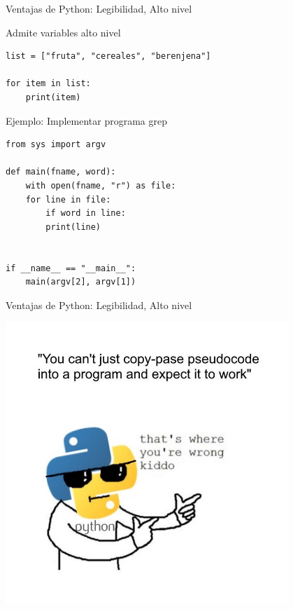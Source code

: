 \documentclass[bigger,unknownkeysallowed]{beamer}
\begin{document}
\begin{frame}[fragile,label={sec:orgfaa25ae}]{Ventajas de Python: Legibilidad, Alto nivel}
 \begin{exampleblock}{Admite variables alto nivel}
\begin{verbatim}
list = ["fruta", "cereales", "berenjena"]

for item in list:
    print(item)
\end{verbatim}
\end{exampleblock}

\begin{exampleblock}{Ejemplo: Implementar programa grep}
\begin{verbatim}
from sys import argv

def main(fname, word):
    with open(fname, "r") as file:
	for line in file:
	    if word in line:
		print(line)


if __name__ == "__main__":
    main(argv[2], argv[1])
\end{verbatim}
\end{exampleblock}
\end{frame}


\begin{frame}[label={sec:org716d4af}]{Ventajas de Python: Legibilidad, Alto nivel}
\begin{center}
\includegraphics[width=0.8\textwidth]{pseudo.jpg}
\end{center}
\end{frame}
\end{document}
